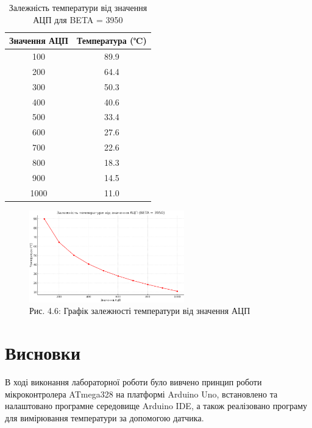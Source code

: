 \documentclass[a4paper]{article}
\begin{document}
\begin{table}[h!]
  \centering
  \begin{tabular}{|c|c|}
  \hline
  \textbf{Значення АЦП} & \textbf{Температура (℃)} \\
  \hline
  100 & 89.9 \\
  200 & 64.4 \\
  300 & 50.3 \\
  400 & 40.6 \\
  500 & 33.4 \\
  600 & 27.6 \\
  700 & 22.6 \\
  800 & 18.3 \\
  900 & 14.5 \\
  1000 & 11.0 \\
  \hline
  \end{tabular}
  \caption{Залежність температури від значення АЦП для BETA = 3950}
  \end{table}

\begin{figure}[h]
  \centering
  \includegraphics[width=0.6\textwidth]{imgs/LW4_5.png} 
  \caption*{Рис. 4.6: Графік залежності температури від значення АЦП}
\end{figure} 

\section*{Висновки}
В ході виконання лабораторної роботи було вивчено принцип роботи мікроконтролера ATmega328 на платформі Arduino Uno, встановлено та налаштовано програмне середовище Arduino IDE, а також реалізовано програму для вимірювання температури за допомогою датчика.
\end{document}
